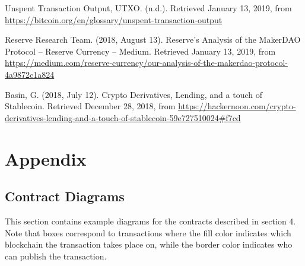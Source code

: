 \documentclass{llncs}
\begin{document}
\begin{flushleft}
\begin{thebibliography}{8}
Unspent Transaction Output, UTXO. (n.d.). Retrieved January 13, 2019, from \url{https://bitcoin.org/en/glossary/unspent-transaction-output}

Reserve Research Team. (2018, August 13). Reserve's Analysis of the MakerDAO Protocol – Reserve Currency – Medium. Retrieved January 13, 2019, from \url{https://medium.com/reserve-currency/our-analysis-of-the-makerdao-protocol-4a9872c1a824}

Basin, G. (2018, July 12). Crypto Derivatives, Lending, and a touch of Stablecoin. Retrieved December 28, 2018, from \url{https://hackernoon.com/crypto-derivatives-lending-and-a-touch-of-stablecoin-59e727510024#f7cd}
\end{thebibliography}
\end{flushleft}

\section{Appendix}
\label{sec:appendix}

\subsection{Contract Diagrams} 

This section contains example diagrams for the contracts described in section 4. Note that boxes correspond to transactions where the fill color indicates which blockchain the transaction takes place on, while the border color indicates who can publish the transaction.
\end{document}
